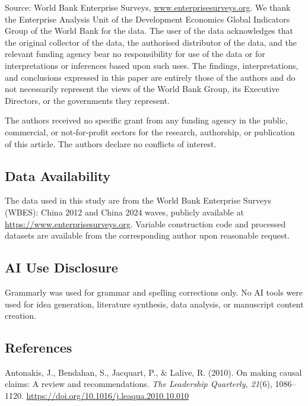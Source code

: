 \documentclass[
  12pt,a4paper]{article}
\begin{document}
Source: World Bank Enterprise Surveys,
\href{http://www.enterprisesurveys.org}{www.enterprisesurveys.org}. We
thank the Enterprise Analysis Unit of the Development Economics Global
Indicators Group of the World Bank for the data. The user of the data
acknowledges that the original collector of the data, the authorised
distributor of the data, and the relevant funding agency bear no
responsibility for use of the data or for interpretations or inferences
based upon such uses. The findings, interpretations, and conclusions
expressed in this paper are entirely those of the authors and do not
necessarily represent the views of the World Bank Group, its Executive
Directors, or the governments they represent.

The authors received no specific grant from any funding agency in the
public, commercial, or not‑for‑profit sectors for the research,
authorship, or publication of this article. The authors declare no
conflicts of interest.

\hypertarget{data-availability}{%
\subsection{Data Availability}\label{data-availability}}

The data used in this study are from the World Bank Enterprise Surveys
(WBES): China 2012 and China 2024 waves, publicly available at
\url{https://www.enterprisesurveys.org}. Variable construction code and
processed datasets are available from the corresponding author upon
reasonable request.

\hypertarget{ai-use-disclosure}{%
\subsection{AI Use Disclosure}\label{ai-use-disclosure}}

Grammarly was used for grammar and spelling corrections only. No AI
tools were used for idea generation, literature synthesis, data
analysis, or manuscript content creation.

\hypertarget{references}{%
\subsection{References}\label{references}}

Antonakis, J., Bendahan, S., Jacquart, P., \& Lalive, R. (2010). On
making causal claims: A review and recommendations. \emph{The Leadership
Quarterly, 21}(6), 1086--1120.
\url{https://doi.org/10.1016/j.leaqua.2010.10.010}
\end{document}

